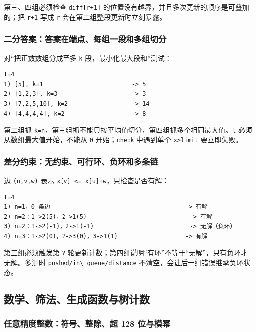 第三、四组必须检查 \passthrough{\lstinline!diff[r+1]!} 的位置没有越界，并且多次更新的顺序是可叠加的；把 \passthrough{\lstinline!r+1!} 写成 \passthrough{\lstinline!r!} 会在第二组整段更新时立刻暴露。

\subsubsection{二分答案：答案在端点、每组一段和多组切分}

对``把正数数组分成至多 \passthrough{\lstinline!k!} 段，最小化最大段和''测试：

\begin{lstlisting}
T=4
1) [5], k=1                         -> 5
2) [1,2,3], k=3                     -> 3
3) [7,2,5,10], k=2                  -> 14
4) [4,4,4,4], k=2                   -> 8
\end{lstlisting}

第二组抓 \passthrough{\lstinline!k=n!}，第三组抓不能只按平均值切分，第四组抓多个相同最大值。\passthrough{\lstinline!l!} 必须从数组最大值开始，不能从 \passthrough{\lstinline!0!} 开始；\passthrough{\lstinline!check!} 中遇到单个 \passthrough{\lstinline!x>limit!} 要立即失败。

\subsubsection{差分约束：无约束、可行环、负环和多条链}

边 \passthrough{\lstinline!(u,v,w)!} 表示 \passthrough{\lstinline!x[v] <= x[u]+w!}，只检查是否有解：

\begin{lstlisting}
T=4
1) n=1，0 条边                                      -> 有解
2) n=2：1->2(5)，2->1(5)                             -> 有解
3) n=2：1->2(-1)，2->1(-1)                           -> 无解（负环）
4) n=3：1->2(0)，2->3(0)，3->1(1)                   -> 有解
\end{lstlisting}

第三组必须触发第 \passthrough{\lstinline!V!} 轮更新计数；第四组说明``有环''不等于``无解''，只有负环才无解。多测时 \passthrough{\lstinline!pushed/in\_queue/distance!} 不清空，会让后一组错误继承负环状态。

\subsection{数学、筛法、生成函数与树计数}

\subsubsection{任意精度整数：符号、整除、超 128 位与模幂}


